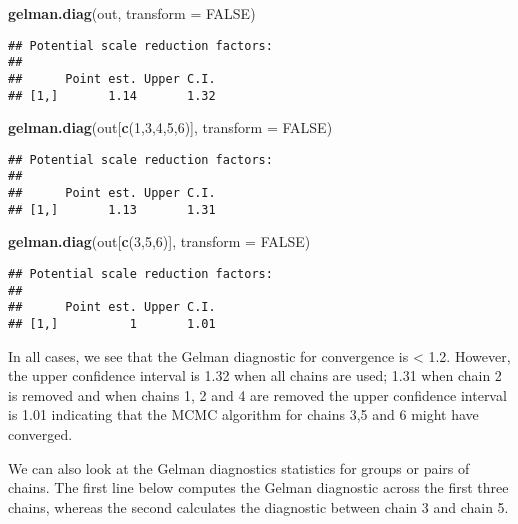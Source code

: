 \documentclass[9pt,a4paper,]{extarticle}
\newenvironment{Shaded}{\begin{snugshade}}{\end{snugshade}}
\newcommand{\DataTypeTok}[1]{\textcolor[rgb]{0.13,0.29,0.53}{#1}}
\newcommand{\DecValTok}[1]{\textcolor[rgb]{0.00,0.00,0.81}{#1}}
\newcommand{\KeywordTok}[1]{\textcolor[rgb]{0.13,0.29,0.53}{\textbf{#1}}}
\newcommand{\NormalTok}[1]{#1}
\newcommand{\OtherTok}[1]{\textcolor[rgb]{0.56,0.35,0.01}{#1}}
\begin{document}
\begin{Shaded}
\begin{Highlighting}[]
\KeywordTok{gelman.diag}\NormalTok{(out, }\DataTypeTok{transform =} \OtherTok{FALSE}\NormalTok{)}
\end{Highlighting}
\end{Shaded}

\begin{verbatim}
## Potential scale reduction factors:
## 
##      Point est. Upper C.I.
## [1,]       1.14       1.32
\end{verbatim}

\begin{Shaded}
\begin{Highlighting}[]
\KeywordTok{gelman.diag}\NormalTok{(out[}\KeywordTok{c}\NormalTok{(}\DecValTok{1}\NormalTok{,}\DecValTok{3}\NormalTok{,}\DecValTok{4}\NormalTok{,}\DecValTok{5}\NormalTok{,}\DecValTok{6}\NormalTok{)], }\DataTypeTok{transform =} \OtherTok{FALSE}\NormalTok{)}
\end{Highlighting}
\end{Shaded}

\begin{verbatim}
## Potential scale reduction factors:
## 
##      Point est. Upper C.I.
## [1,]       1.13       1.31
\end{verbatim}

\begin{Shaded}
\begin{Highlighting}[]
\KeywordTok{gelman.diag}\NormalTok{(out[}\KeywordTok{c}\NormalTok{(}\DecValTok{3}\NormalTok{,}\DecValTok{5}\NormalTok{,}\DecValTok{6}\NormalTok{)], }\DataTypeTok{transform =} \OtherTok{FALSE}\NormalTok{)}
\end{Highlighting}
\end{Shaded}

\begin{verbatim}
## Potential scale reduction factors:
## 
##      Point est. Upper C.I.
## [1,]          1       1.01
\end{verbatim}

In all cases, we see that the Gelman diagnostic for convergence is \textless{} 1.2.
However, the upper confidence interval is 1.32 when all chains are used; 1.31
when chain 2 is removed and when chains 1, 2 and 4 are removed the upper confidence interval
is 1.01 indicating that the MCMC algorithm for chains 3,5 and 6 might have converged.

We can also look at the Gelman diagnostics statistics for groups or
pairs of chains. The first line below computes the Gelman diagnostic
across the first three chains, whereas the second calculates the diagnostic
between chain 3 and chain 5.
\end{document}
